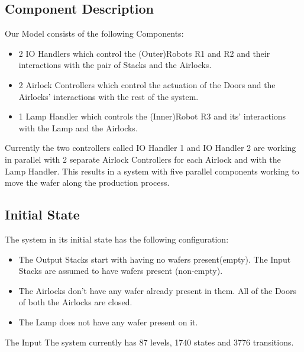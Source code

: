 \documentclass[a4paper,12pt]{article}
\begin{document}
	\subsection{Component Description}
	Our Model consists of the following Components:
	\begin{itemize}
		\item 2 IO Handlers which control the (Outer)Robots R1 and R2 and their interactions with the pair of Stacks and the Airlocks.
		\item 2 Airlock Controllers which control the actuation of the Doors and the Airlocks' interactions with the rest of the system.
		\item 1 Lamp Handler which controls the (Inner)Robot R3 and its' interactions with the Lamp and the Airlocks.
	\end{itemize}
	Currently the two controllers called IO Handler 1 and IO Handler 2 are working in parallel with 2 separate Airlock Controllers for each Airlock and with the Lamp Handler. This results in a system with five parallel components working to move the wafer along the production process. 
	\subsection{Initial State}
	The system in its initial state has the following configuration:
	\begin{itemize}
		\item The Output Stacks start with having no wafers present(empty). The Input Stacks are assumed to have wafers present (non-empty).
		\item The Airlocks don't have any wafer already present in them. All of the Doors of both the Airlocks are closed.
		\item The Lamp does not have any wafer present on it.
	\end{itemize} 
	The Input The system currently has 87 levels, 1740 states and 3776 transitions.
\end{document}
